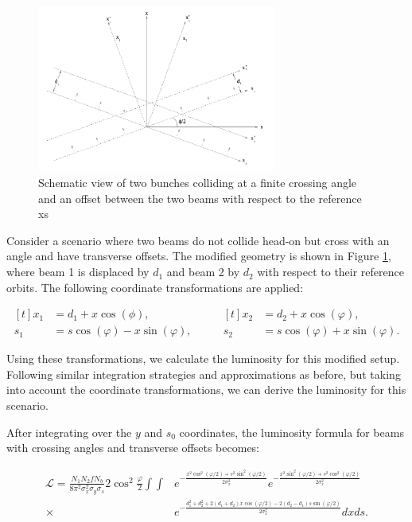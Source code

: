\begin{figure}
    \centering
    \includegraphics[width=0.7\textwidth]{figures/lumi_geometry.png}
    \caption{Schematic view of two bunches colliding at a finite crossing angle and an offset between the two beams with respect to the reference xs}
    \label{fig:lumi-geometry}
\end{figure}

Consider a scenario where two beams do not collide head-on but cross with an angle and have transverse offsets. The modified geometry is shown in Figure \ref{fig:lumi-geometry}, where beam 1 is displaced by \(d_1\) and beam 2 by \(d_2\) with respect to their reference orbits. The following coordinate transformations are applied:

\begin{equation}
\begin{aligned}[t]
x_1 &= d_1 + x \cos(\phi),  \\
s_1 &= s \cos(\varphi) - x \sin(\varphi),
\end{aligned}
\qquad
\begin{aligned}[t]
       x_2 &= d_2 + x \cos(\varphi), \\
        s_2 &= s \cos(\varphi) + x \sin(\varphi).
\end{aligned}
\end{equation}

Using these transformations, we calculate the luminosity for this modified setup. Following similar integration strategies and approximations as before, but taking into account the coordinate transformations, we can derive the luminosity for this scenario.

After integrating over the \(y\) and \(s_0\) coordinates, the luminosity formula for beams with crossing angles and transverse offsets becomes:

\begin{align}
\mathcal{L} = \frac{N_1 N_2  f  N_b}{8 \pi^2  \sigma_x^2 \sigma_y  \sigma_s} 2 \cos^2\frac{\varphi} {2}\int\int &e^{-\frac{x^2 \cos^2(\varphi/2) + s^2 \sin^2(\varphi/2)}{2 \sigma_x^2}}e^{-\frac{x^2 \sin^2(\varphi/2) + s^2 \cos^2(\varphi/2)}{2 \sigma_x^2}}\\
\times & e^{-\frac{d_1^2+d_2^2+2(d_1+d_2)x\cos(\varphi/2)-2(d_2-d_1)s\sin(\varphi/2)}{2\sigma_x^2}}dxds.
\end{align}

